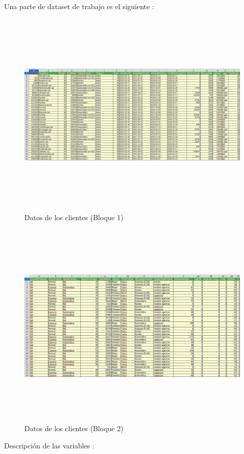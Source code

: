 Una parte de dataset de trabajo es el siguiente :

\begin{figure}[H]
    \centering
       \includegraphics[width=12cm, height=10cm ]{Imagenes/Datos_Clientes1.PNG }
      \caption{Datos de los clientes (Bloque 1)}
      \label{fig:clis1}
\end{figure}
\newpage
\begin{figure}[H]
    \centering
       \includegraphics[width=12cm, height=10cm ]{Imagenes/Datos_Clientes2.PNG }
      \caption{Datos de los clientes (Bloque 2)}
      \label{fig:clis2}
\end{figure}
 
Descripción de las variables :

